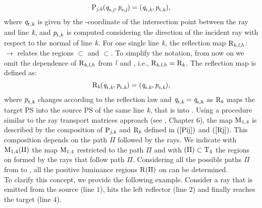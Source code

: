  \begin{equation}\label{Pij}
\mathrm{P}_{\textit{j},\textit{k}}(\textit{q}_{\textrm{s,} \textit{\textit{j}}},\textit{p}_{\textrm{s,} \textit{\textit{j}}})=(\textit{q}_{\textrm{t,} \textit{\textit{k}}},\textit{p}_{\textrm{t,} \textit{\textit{k}}}),
\end{equation}
where $\textit{q}_{\textrm{t,} \textit{\textit{k}}}$ is given by the -coordinate of the intersection point between the ray and line $\textit{k}$,
and $\textit{p}_{\textrm{t,} \textit{\textit{k}}}$ is computed considering the direction of the incident ray with respect to the normal of line $\textit{k}$. 
For one single line $\textit{k}$, the reflection map $\mathrm{R}_{\textit{k},\textit{l},h}$:~ $\rightarrow$  relates the regions $\subset$ and
$\subset$. To simplify the notation, from now on we omit the dependence of $\mathrm{R}_{\textit{k},\textit{l},h}$ from $\textit{l}$ and , i.e., $\mathrm{R}_{\textit{k},\textit{l},h} = \mathrm{R}_{\textit{k}}$. The reflection map is defined as:
\begin{equation}\label{Rj}
\mathrm{R}_{\textit{k}}(\textit{q}_{\textrm{t},\textit{\textit{k}}},\textit{p}_{\textrm{t},\textit{\textit{k}}})=(\textit{q}_{\textrm{s},\textit{\textit{k}}},\textit{p}_{\textrm{s},\textit{\textit{k}}}),
\end{equation}
where $\textit{p}_{\textrm{t,} \textit{\textit{k}}}$ changes according to the reflection law and $\textit{q}_{\textrm{t,} \textit{\textit{k}}}= \textit{q}_{\textrm{s,} \textit{\textit{k}}}$ as $\mathrm{R}_{\textit{k}}$ maps the target PS into the source PS of the same line $\textit{k}$, that is  into .
Using a procedure similar to the ray transport matrices approach (see \cite{hecht1998hecht}, Chapter 6),
the map $\mathrm{M}_{1,4}$ is described by the composition of $\mathrm{P}_{\textit{j},\textit{k}}$ and $\mathrm{R}_{\textit{k}}$ defined in $(\ref{Pij})$ and $(\ref{Rj})$. This composition depends on the path $\Pi$ followed by the rays.
We indicate with $\mathrm{M}_{1,4}(\Pi)$
the map $\mathrm{M}_{1,4}$ restricted to the path $\Pi$ and with $(\Pi)\subset \mbox{$\textup{T}_{\textit{$4$}}$}$ the regions on  formed by the rays that follow path $\Pi$.
Considering all the possible paths $\Pi$ from  to , all the positive luminance regions $\mbox{$\textup{R}_{\textit{}}$}(\Pi)$ on  can be determined.
\\ \indent To clarify this concept, we provide the following example.
Consider a ray that is emitted from the source (line $1$), hits the left reflector (line $2$) and finally reaches the target (line $4$).
